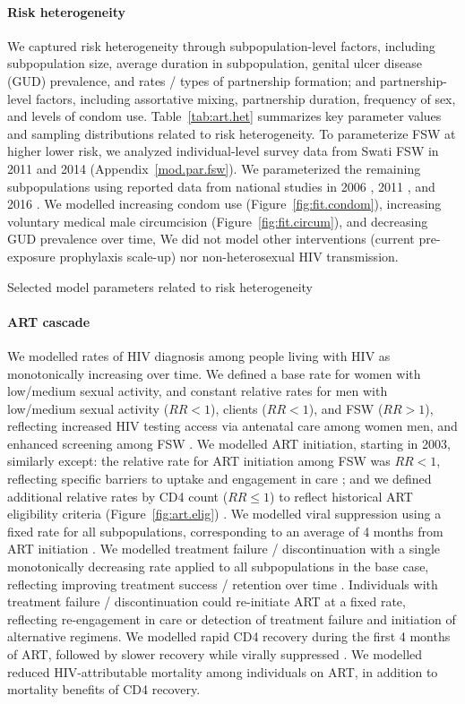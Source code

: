 \paragraph{Risk heterogeneity}
We captured risk heterogeneity through subpopulation-level factors, including
subpopulation size, average duration in subpopulation,
genital ulcer disease (GUD) prevalence, and rates / types of partnership formation;
and partnership-level factors, including
assortative mixing, partnership duration, frequency of sex, and levels of condom use.
Table~\ref{tab:art.het} summarizes key parameter values and sampling distributions related to risk heterogeneity.
To parameterize FSW at higher \vs lower risk, we analyzed individual-level survey data
from Swati FSW in 2011 \cite{Baral2014} and 2014 \cite{EswKP2014} (Appendix~\ref{mod.par.fsw}).
We parameterized the remaining subpopulations using reported data from national studies in
2006 \cite{SDHS2006}, 2011 \cite{SHIMS1}, and 2016 \cite{SHIMS2}.
We modelled
increasing condom use (Figure~\ref{fig:fit.condom}),
increasing voluntary medical male circumcision (Figure~\ref{fig:fit.circum}), and
decreasing GUD prevalence over time,
We did not model other interventions
(\eg current pre-exposure prophylaxis scale-up)
nor non-heterosexual HIV transmission.
\begin{table}
  \centering
  \caption{Selected model parameters related to risk heterogeneity}
  
  \label{tab:art.het}
\end{table}
\paragraph{ART cascade}
We modelled rates of HIV diagnosis among people living with HIV as monotonically increasing over time.
We defined a base rate for women with low/medium sexual activity,
and constant relative rates for
men with low/medium sexual activity ($RR < 1$), clients ($RR < 1$), and FSW ($RR > 1$),
reflecting increased HIV testing access via antenatal care among women \vs men,
and enhanced screening among FSW \cite{Baral2014}.
We modelled ART initiation, starting in 2003, similarly except:
the relative rate for ART initiation among FSW was $RR < 1$,
reflecting specific barriers to uptake and engagement in care \cite{Lancaster2016sr}; and
we defined additional relative rates by CD4 count ($RR \le 1$)
to reflect historical ART eligibility criteria (Figure~\ref{fig:art.elig}) \cite{SHIMS2}.
We modelled viral suppression using a fixed rate for all subpopulations,
corresponding to an average of 4 months from ART initiation \cite{Mujugira2016}.
We modelled treatment failure / discontinuation with a single monotonically decreasing rate
applied to all subpopulations in the base case,
reflecting improving treatment success / retention over time \cite{SHIMS2}.
Individuals with treatment failure / discontinuation could re-initiate ART at a fixed rate,
reflecting re-engagement in care or detection of treatment failure and initiation of alternative regimens.
We modelled rapid CD4 recovery during the first 4 months of ART,
followed by slower recovery while virally suppressed \cite{Gabillard2013}.
We modelled reduced HIV-attributable mortality among individuals on ART,
in addition to mortality benefits of CD4 recovery.
